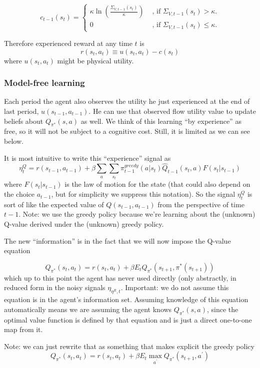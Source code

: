 \documentclass[12pt]{article}%
\begin{document}
\[
c_{t-1}(s_{t})=
\begin{cases}
\kappa\ln(\frac{\Sigma_{V,t-1}(s_{t})}{\kappa}) & \text{ , if } {\Sigma
}_{V,t-1}(s_{t}) > \kappa.\\
0 & \text{ , if } {\Sigma}_{V,t-1}(s_{t}) \leq\kappa.
\end{cases}
\]


Therefore experienced reward at any time $t$ is
\[
r(s_{t},a_{t})\equiv u(s_{t},a_{t})-c(s_{t})
\]
where $u(s_{t},a_{t})$ might be physical utility.

\subsubsection{Model-free learning}

Each period the agent also observes the utility he just experienced at the end
of last period, $u(s_{t-1},a_{t-1})$. He can use that observed flow utility
value to update beliefs about $Q_{\pi^{*}}(s,a)$ as well. We think of this
learning ``by experience'' as free, so it will not be subject to a cognitive
cost. Still, it is limited as we can see below.

It is most intuitive to write this ``experience'' signal as
\[
\eta_{t}^{Q} = r(s_{t-1}, a_{t-1}) + \beta\sum_{a} \sum_{s_{t}} \pi
_{t-1}^{greedy} (a |s_{t}) \widehat Q_{t-1}(s_{t},a) F(s_{t} | s_{t-1})
\]
where $F(s_{t} | s_{t-1})$ is the law of motion for the state (that could also
depend on the choice $a_{t-1}$, but for simplicity we suppress this notation).
So the signal $\eta_{t}^{Q}$ is sort of like the expected value of $Q(s_{t-1},
a_{t-1})$ from the perspective of time $t-1$. Note: we use the greedy policy
because we're learning about the (unknown) Q-value derived under the (unknown)
greedy policy.

The new ``information'' is in the fact that we will now impose the Q-value equation%

\[
Q_{\pi^{*}}(s_{t},a_{t})=r(s_{t},a_{t})+\beta E_{t}Q_{\pi^{*}} (s_{t+1}%
,\pi^{*}(s_{t+1}))
\]
which up to this point the agent has never used directly (only abstractly, in
reduced form in the noisy signals $\eta_{\eta^{R},t}$. Important: we do not
assume this equation is in the agent's information set. Assuming knowledge of
this equation automatically means we are assuming the agent knows $Q_{\pi^{*}%
}(s,a)$, since the optimal value function is defined by that equation and is
just a direct one-to-one map from it.

Note: we can just rewrite that as something that makes explicit the greedy
policy
\[
Q_{\pi^{*}}(s_{t},a_{t})=r(s_{t},a_{t})+\beta E_{t}\max_{a^{\prime}}Q_{\pi
^{*}}(s_{t+1},a^{\prime})
\]
\end{document}
